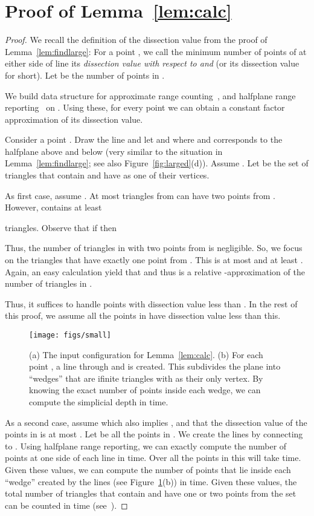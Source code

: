 \section{Proof of Lemma~\ref{lem:calc}}\label{sec:calc}
\lemcalc*
\begin{proof}
    We recall the definition of the dissection value from the proof of Lemma~\ref{lem:findlarge}:
    For a point , we call the minimum number of points of  
    at either side of line  its {\em dissection value with respect
    to  and } (or its dissection value for short).
	Let  be the number of points in .

	We build data structure for approximate range counting~\cite{Afshani.Chan.SOCG07}, 
	and halfplane range reporting~\cite{cgl85} on .
	Using these, for every point 
	 we can obtain a constant factor approximation of its dissection value.

	Consider a point .
	Draw the line  and 
    let  and  where  and 
    corresponds to the halfplane above and below 
	(very similar to the situation in Lemma~\ref{lem:findlarge}; see also Figure~\ref{fig:larged}(d)).
	Assume .
	Let  be the set of triangles that contain  and have  as one of their vertices.


	As first case, assume .
	At most  triangles from  can have two points from .
	However,  contains at least 
	 
	triangles.
	Observe that if  then 
	 
	Thus, the number of triangles in  with two points from  is negligible.
	So, we focus on the triangles that have exactly one point from . 
	This is at most  and at least .
	Again, an easy calculation yield that  and thus
	 is a relative -approximation of the number of triangles
	in .

	Thus, it suffices to handle points with dissection value less than .
	In the rest of this proof, we assume all the points in  have dissection value
	less than this.

\begin{figure}[b]
    \centering
    \texttt{[image: figs/small]}
    \caption{(a) The input configuration for Lemma~\ref{lem:calc}. (b) For each
    point , a line through  and  is created. This subdivides the
    plane into ``wedges'' that are ifinite triangles with  as their only vertex. By knowing
    the exact number of points inside each wedge, we can compute the simplicial depth in  time.}
    \label{fig:small}
\end{figure}

	As a second case,	assume  which also implies ,
	and that the dissection value of the points in  is at most .
	Let  be all the points in .
	We create the lines  by connecting  to .
	Using halfplane range reporting, we can exactly compute the number of points at one side of 
	each line  in  time. 
	Over all the points in  this will take  time. 
	Given these values, we can compute the number of points that lie inside each ``wedge'' created
	by the lines  (see Figure~\ref{fig:small}(b)) in
	 time. 
	Given these values, the total number of triangles that contain  and have one or two 
	points from the set  can be counted in  time
    (see~\cite{GilStWi1992,KhullerJo1990}).


\end{proof}
